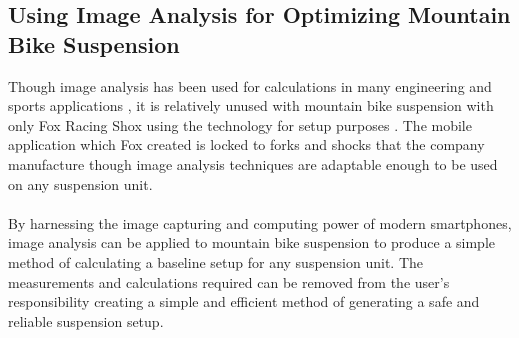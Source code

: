 \subsection{Using Image Analysis for Optimizing Mountain Bike Suspension}
Though image analysis has been used for calculations in many engineering and sports applications \citep{concreteanalysis, bridgecables}, it is relatively unused with mountain bike suspension with only Fox Racing Shox using the technology for setup purposes \citep{foxird}. The mobile application which Fox created is locked to \glspl{fork} and \glspl{shock} that the company manufacture though image analysis techniques are adaptable enough to be used on any suspension unit.
\\\\
By harnessing the image capturing and computing power of modern smartphones, image analysis can be applied to mountain bike suspension to produce a simple method of calculating a baseline setup for any suspension unit. The measurements and calculations required can be removed from the user's responsibility creating a simple and efficient method of generating a safe and reliable suspension setup.